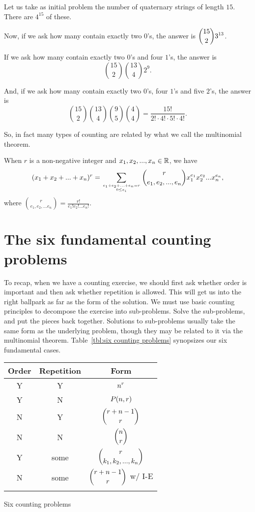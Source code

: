 \begin{exmp}\label{exmp:quaternary 15}
Let us take as initial problem the number of quaternary strings of length $15$.
There are $4^{15}$ of these. 

Now, if we ask how many contain exactly two $0$'s, the answer is
$\displaystyle{{15\choose 2}3^{13}}$. 

If we ask how many contain exactly two $0$'s and four $1$'s, the answer
is 
\[
\binom{15}{2}\binom{13}{4}2^9.
\]

And, if we ask how many contain exactly two $0$'s, four $1$'s and
five $2$'s, the answer is
\[
\binom{15}{2}\binom{13}{4}\binom{9}{5}\binom{4}{4} = \frac{15!}{2!\cdot4!\cdot5!\cdot4!}.
\]
\end{exmp}
So, in fact many types of counting are related by what we call the multinomial theorem.
\begin{thm}
 When $r$ is a non-negative integer and $x_1,x_2,...,x_n\in \mathbb{R}$, we have
 \[
  (x_1+x_2+...+x_n)^r=\sum_{{e_1+e_2+...+e_n=r\atop 0\leq e_i}} 
  \binom{r}{e_1,e_2,...,e_n} x_1^{e_1} x_2^{e_2}... x_n^{e_n},
 \]
 where $\displaystyle {\binom{r}{e_1,e_2,...e_n}=\frac{r!}{e_1!e_2!...e_n!}}$.
\end{thm}

\section{The six fundamental counting problems}
To recap, when we have a counting exercise, we should first ask whether order is important and then
ask whether repetition is allowed. This will get us into the right ballpark as far as the form of the solution.
We must use basic counting principles to decompose the exercise into sub-problems. Solve the 
sub-problems, and put the pieces back together. Solutions to sub-problems usually take the same
form as the underlying problem, though they may be related to it via the multinomial theorem. 
Table~\ref{tbl:six counting problems} synopsizes our six fundamental cases.
\begin{margintable}
\centering
\begin{tabular}{ccc}
\toprule
Order & Repetition & Form \\
\midrule
Y   &  Y   &  $\displaystyle{n^r}$   \\ \addlinespace
Y   &  N   &  $\displaystyle{P(n,r)}$   \\ \addlinespace
N   &  Y   &  $\displaystyle{{r+n-1\choose r}}$ \\ \addlinespace
N   &  N   &  $\displaystyle{{n\choose r}}$  \\ \addlinespace 
Y   & some & $\displaystyle{{r\choose k_1,k_2,...,k_n}}$ \\ \addlinespace
N   & some & $\displaystyle{{r+n-1\choose r}}$ w/ I-E \\ \addlinespace
\bottomrule
\end{tabular} %
\caption{Six counting problems}\label{tbl:six counting problems}
\end{margintable}



